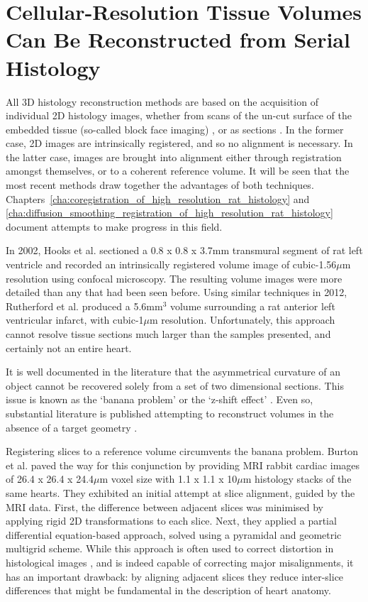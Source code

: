 \section{Cellular-Resolution Tissue Volumes Can Be Reconstructed from Serial Histology} %
\label{sec:cellular_resolution_tissue_volumes_can_be_reconstructed_from_serial_histology}
  All 3D histology reconstruction methods are based on the acquisition of individual 2D histology images, whether from scans of the un-cut surface of the embedded tissue (so-called block face imaging) \cite{Sands2005,Sands2006,Rutherford2012}, or as sections \cite{Burton2006,Plank2009}. In the former case, 2D images are intrinsically registered, and so no alignment is necessary. In the latter case, images are brought into alignment either through registration amongst themselves, or to a coherent reference volume. It will be seen that the most recent methods draw together the advantages of both techniques. Chapters~\ref{cha:coregistration_of_high_resolution_rat_histology} and \ref{cha:diffusion_smoothing_registration_of_high_resolution_rat_histology} document attempts to make progress in this field.
  
  In 2002, Hooks et al. \cite{Hooks2002} sectioned a 0.8 x 0.8 x 3.7mm transmural segment of rat left ventricle and recorded an intrinsically registered volume image of cubic-1.56$\mu$m resolution using confocal microscopy. The resulting volume images were more detailed than any that had been seen before. Using similar techniques in 2012, Rutherford et al. \cite{Rutherford2012} produced a 5.6mm$^3$ volume surrounding a rat anterior left ventricular infarct, with cubic-1$\mu$m resolution. Unfortunately, this approach cannot resolve tissue sections much larger than the samples presented, and certainly not an entire heart.
  
  It is well documented in the literature that the asymmetrical curvature of an object cannot be recovered solely from a set of two dimensional sections. This issue is known as the `banana problem' \cite{Malandain2004,Lyon2012} or the `z-shift effect' \cite{Yushkevich2006}. Even so, substantial literature is published attempting to reconstruct volumes in the absence of a target geometry \cite{Chakravarty2006,Schmitt2006,Cifor2009,Cifor2011}.
  
  Registering slices to a reference volume circumvents the banana problem. Burton et al. \cite{Burton2006} paved the way for this conjunction by providing MRI rabbit cardiac images of 26.4 x 26.4 x 24.4$\mu$m voxel size with 1.1 x 1.1 x 10$\mu$m histology stacks of the same hearts. They exhibited an initial attempt at slice alignment, guided by the MRI data. First, the difference between adjacent slices was minimised by applying rigid 2D transformations to each slice. Next, they applied a partial differential equation-based approach, solved using a pyramidal and geometric multigrid scheme. While this approach is often used to correct distortion in histological images \cite{Keeling2005}, and is indeed capable of correcting major misalignments, it has an important drawback: by aligning adjacent slices they reduce inter-slice differences that might be fundamental in the description of heart anatomy.
  
